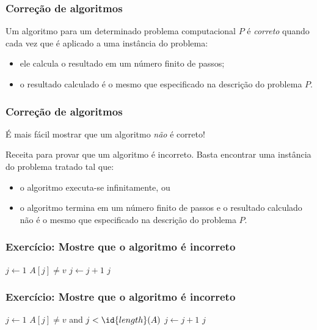 \documentclass{beamer}
\begin{document}
\begin{frame}

  \frametitle{Correção de algoritmos}

  Um algoritmo para um determinado problema computacional $P$ é \emph{correto}
  quando cada vez que é aplicado a uma instância do problema:
  \pause
  \begin{itemize}
    \item ele calcula o resultado em um número finito de passos;
    \item o resultado calculado é o mesmo que especificado na descrição do
      problema $P$.
  \end{itemize}

\end{frame}

\begin{frame}

  \frametitle{Correção de algoritmos}

  É mais fácil mostrar que um algoritmo \emph{não} é correto!
  \pause

  \begin{block}{Receita para provar que um algoritmo é incorreto.}
  Basta encontrar uma instância do problema tratado tal que:
  \begin{itemize}
    \item o algoritmo executa-se infinitamente, ou
    \item o algoritmo termina em um número finito de passos e o resultado
      calculado não é o mesmo que especificado na descrição do problema $P$.
  \end{itemize}
  \end{block}

\end{frame}

\begin{frame}

  \frametitle{Exercício: Mostre que o algoritmo é incorreto}

\begin{codebox}
\li $j \gets 1$
\li \While $A[j] \neq v$
\li \Do
      $j \gets j+1$
    \End
\li \Return $j$
\end{codebox}  

\end{frame}

\begin{frame}
  \frametitle{Exercício: Mostre que o algoritmo é incorreto}

\begin{codebox}
\li $j \gets 1$
\li \While $A[j] \neq v$ and $j < \id{length}(A)$
\li \Do
      $j \gets j+1$
    \End
\li \Return $j$
\end{codebox}  

\end{frame}
\end{document}
